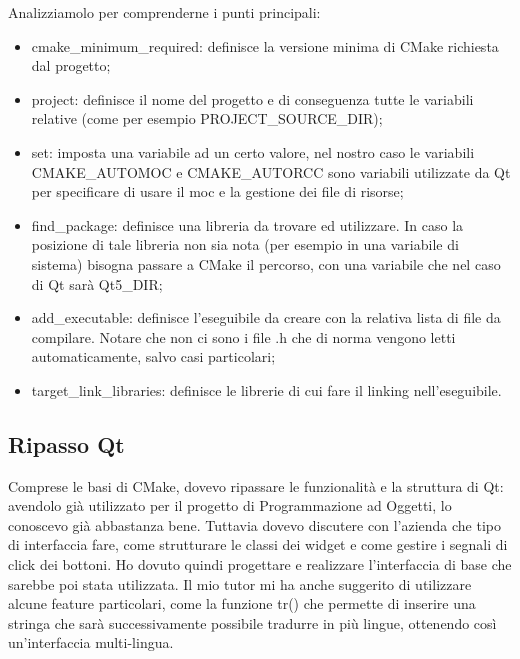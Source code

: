 Analizziamolo per comprenderne i punti principali:
\begin{itemize}
	\item cmake\_minimum\_required: definisce la versione minima di CMake richiesta dal progetto;
	\item project: definisce il nome del progetto e di conseguenza tutte le variabili relative (come per esempio PROJECT\_SOURCE\_DIR);
	\item set: imposta una variabile ad un certo valore, nel nostro caso le variabili CMAKE\_AUTOMOC e CMAKE\_AUTORCC sono variabili utilizzate da Qt per specificare di usare il moc e la gestione dei file di risorse;
	\item find\_package: definisce una libreria da trovare ed utilizzare. In caso la posizione di tale libreria non sia nota (per esempio in una variabile di sistema) bisogna passare a CMake il percorso, con una variabile che nel caso di Qt sarà Qt5\_DIR;
	\item add\_executable: definisce l'eseguibile da creare con la relativa lista di file da compilare. Notare che non ci sono i file .h che di norma vengono letti automaticamente, salvo casi particolari;
	\item target\_link\_libraries: definisce le librerie di cui fare il linking nell'eseguibile.
\end{itemize}

\subsection{Ripasso Qt}
Comprese le basi di CMake, dovevo ripassare le funzionalità e la struttura di Qt: avendolo già utilizzato per il progetto di Programmazione ad Oggetti, lo conoscevo già abbastanza bene. Tuttavia dovevo discutere con l'azienda che tipo di interfaccia fare, come strutturare le classi dei widget e come gestire i segnali di click dei bottoni. Ho dovuto quindi progettare e realizzare l'interfaccia di base che sarebbe poi stata utilizzata. Il mio tutor mi ha anche suggerito di utilizzare alcune feature particolari, come la funzione tr() che permette di inserire una stringa che sarà successivamente possibile tradurre in più lingue, ottenendo così un'interfaccia multi-lingua.

